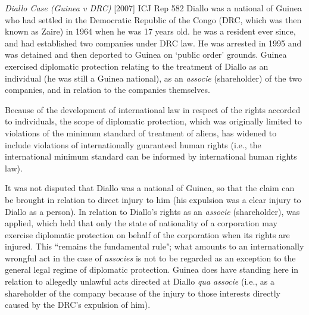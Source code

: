 \begin{casedetails}{\textit{Diallo Case (Guinea v DRC)} [2007] ICJ Rep 582}
    \flushleft
    Diallo was a national of Guinea who had settled in the Democratic Republic of the Congo (DRC, which was then known as Zaire) in 1964 when he was 17 years old. he was a resident ever since, and had established two companies under DRC law. He was arrested in 1995 and was detained and then deported to Guinea on `public order' grounds. Guinea exercised diplomatic protection relating to the treatment of Diallo as an individual (he was still a Guinea national), as an \textit{associe} (shareholder) of the two companies, and in relation to the companies themselves.

    \vspace{\baselineskip}

    Because  of the development of international law in respect of the rights accorded to individuals, the scope of diplomatic protection, which was originally limited to violations of the minimum standard of treatment of aliens, has widened to include violations of internationally guaranteed human rights (i.e., the international minimum standard can be informed by international human rights law).

    \vspace{\baselineskip}

    It was not disputed that Diallo was a national of Guinea, so that the claim can be brought in relation to direct injury to him (his expulsion was a clear injury to Diallo as a person). In relation to Diallo's rights as an \textit{associe} (shareholder),  was applied, which held that only the state of nationality of a corporation may exercise diplomatic protection on behalf of the corporation when its rights are injured. This ``remains the fundamental rule"; what amounts to an internationally wrongful act in the case of \textit{associes} is not to be regarded as an exception to the general legal regime of diplomatic protection. Guinea does have standing here in relation to allegedly unlawful acts directed at Diallo \textit{qua associe} (i.e., as a shareholder of the company because of the injury to those interests directly caused by the DRC's expulsion of him).

    \vspace{\baselineskip}


\end{casedetails}

